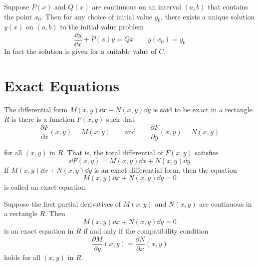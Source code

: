 \documentclass[../diffeq.tex]{subfiles}
\begin{document}
\begin{theorem}
    Suppose $P(x)$ and $Q(x)$ are continuous on an interval $(a,b)$ that contains the point $x_0$. Then for any choice of initial value $y_0$, there exists a unique solution $y(x)$ on $(a,b)$ to the initial value problem 
    \[ \frac{\dd y}{\dd x}+P(x)y=Qx \qquad y(x_0)=y_0 \]
    In fact the solution is given for a suitable value of $C$.
\end{theorem}

\section{Exact Equations}
\begin{definition}
    The differential form $M(x,y)\dd x + N(x,y)\dd y$ is said to be exact in a rectangle $R$ is there is a function $F(x,y)$ such that 
    \[ \frac{\partial F}{\partial x}(x,y)=M(x,y) \qquad \text{and} \qquad \frac{\partial F}{\partial y}(x,y)=N(x,y)\]

    for all $(x,y)$ in $R$. That is, the total differential of $F(x,y)$ satisfies 
    \[ \dd F(x,y)=M(x,y)\dd x+N(x,y)\dd y \]
    If $M(x,y)\dd x + N(x,y)\dd y$ is an exact differential form, then the equation 
    \[ M(x,y)\dd x + N(x,y)\dd y =0 \]
    is called an exact equation.
\end{definition}

\begin{theorem}
    Suppose the first partial derivatives of $M(x,y)$ and $N(x,y)$ are continuous in a rectangle $R$. Then 
    \[ M(x,y)\dd x+ N(x,y)\dd y =0 \]
    is an exact equation in $R$ if and only if the compatibility condition 
    \[ \frac{\partial M}{\partial y}(x,y)=\frac{\partial N}{\partial x}(x,y) \]
    holds for all $(x,y)$ in $R$.
\end{theorem}
\end{document}
